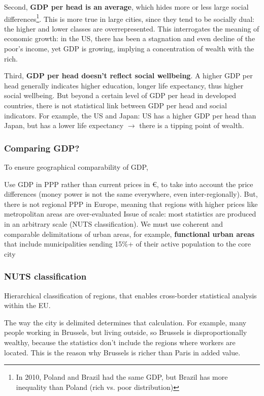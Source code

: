 \documentclass{article}
\begin{document}
Second, \textbf{GDP per head is an average}, which hides more or less large social differences\footnote{In 2010, Poland and Brazil had the same GDP, but Brazil has more inequality than Poland (rich vs. poor distribution)}. This is more true in large cities, since they tend to be socially dual: the higher and lower classes are overrepresented. 
This interrogates the meaning of economic growth: in the US, there has been a stagnation and even decline of the poor's income, yet GDP is growing, implying a concentration of wealth with the rich. 

Third, \textbf{GDP per head doesn't reflect social wellbeing}. A higher GDP per head generally indicates higher education, longer life expectancy, thus higher social wellbeing. But beyond a certain level of GDP per head in developed countries, there is not statistical link between GDP per head and social indicators. 
For example, the US and Japan: US has a higher GDP per head than Japan, but has a lower life expectancy $\rightarrow$ there is a tipping point of wealth.

\subsubsection{Comparing GDP?}

To ensure geographical comparability of GDP,

\begin{outline}
	\1 Use GDP in PPP rather than current prices in €, to take into account the price differences (money power is not the same everywhere, even inter-regionally). But, there is not regional PPP in Europe, meaning that regions with higher prices like metropolitan areas are over-evaluated
	\1 Issue of scale: most statistics are produced in an arbitrary scale (NUTS classification). We must use coherent and comparable delimitations of urban areas, for example, \textbf{functional urban areas} that include municipalities sending 15\%+ of their active population to the core city
	
\end{outline}

\subsubsection{NUTS classification}

Hierarchical classification of regions, that enables cross-border statistical analysis within the EU. 

The way the city is delimited determines that calculation. For example, many people working in Brussels, but living outside, so Brussels is disproportionally wealthy, because the statistics don't include the regions where workers are located. This is the reason why Brussels is richer than Paris in added value. 
\end{document}
